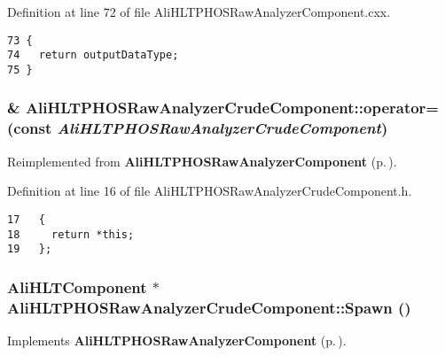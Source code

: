 Definition at line 72 of file Ali\-HLTPHOSRaw\-Analyzer\-Component.cxx.

\footnotesize\begin{verbatim}73 {
74   return outputDataType;
75 }
\end{verbatim}\normalsize 


\subsubsection{\& Ali\-HLTPHOSRaw\-Analyzer\-Crude\-Component::operator= (const  {\em Ali\-HLTPHOSRaw\-Analyzer\-Crude\-Component})\hspace{0.3cm}{\tt  [inline]}}\label{classAliHLTPHOSRawAnalyzerCrudeComponent_AliHLTPHOSRawAnalyzerCrudeComponenta3}




Reimplemented from {\bf Ali\-HLTPHOSRaw\-Analyzer\-Component} {\rm (p.\,\pageref{classAliHLTPHOSRawAnalyzerComponent_AliHLTPHOSRawAnalyzerComponenta3})}.

Definition at line 16 of file Ali\-HLTPHOSRaw\-Analyzer\-Crude\-Component.h.

\footnotesize\begin{verbatim}17   {
18     return *this;
19   };
\end{verbatim}\normalsize 


\subsubsection{\setlength{\rightskip}{0pt plus 5cm}Ali\-HLTComponent $\ast$ Ali\-HLTPHOSRaw\-Analyzer\-Crude\-Component::Spawn ()\hspace{0.3cm}{\tt  [virtual]}}\label{classAliHLTPHOSRawAnalyzerCrudeComponent_AliHLTPHOSRawAnalyzerCrudeComponenta5}




Implements {\bf Ali\-HLTPHOSRaw\-Analyzer\-Component} {\rm (p.\,\pageref{classAliHLTPHOSRawAnalyzerComponent_AliHLTPHOSRawAnalyzerComponenta11})}.

